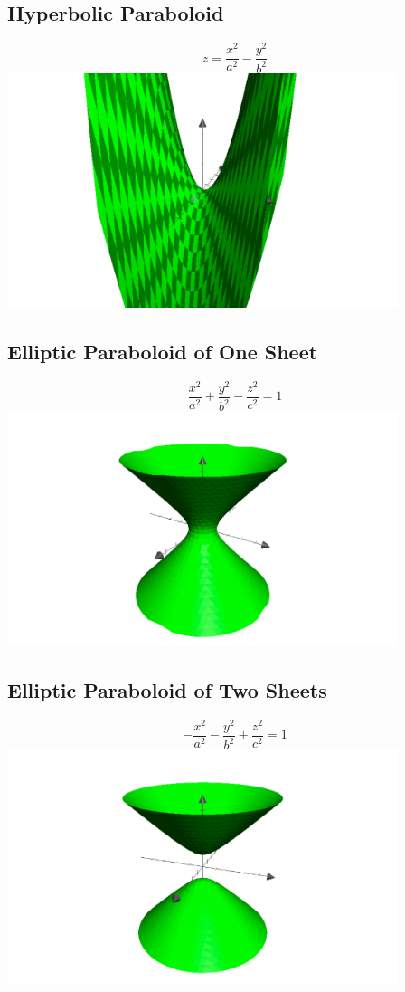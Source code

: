 \documentclass[10pt,letterpaper]{article}
\begin{document}
	\subsection{Hyperbolic Paraboloid}
	\[ z=\frac{x^2}{a^2}-\frac{y^2}{b^2}  \]
	\includegraphics[width=4.5in]{hyperbolicparoboloid.pdf}
		
	\subsection{Elliptic Paraboloid of One Sheet}
	\[  \frac{x^2}{a^2}+\frac{y^2}{b^2}-\frac{z^2}{c^2}=1 \]
	\includegraphics[width=4.5in]{elliptichyperboloid1.pdf}
	\newpage
		
	\subsection{Elliptic Paraboloid of Two Sheets}
	\[  -\frac{x^2}{a^2}-\frac{y^2}{b^2}+\frac{z^2}{c^2}=1 \]
	\includegraphics[width=4.5in]{elliptichyperboloid2.pdf}
	
\end{document}
